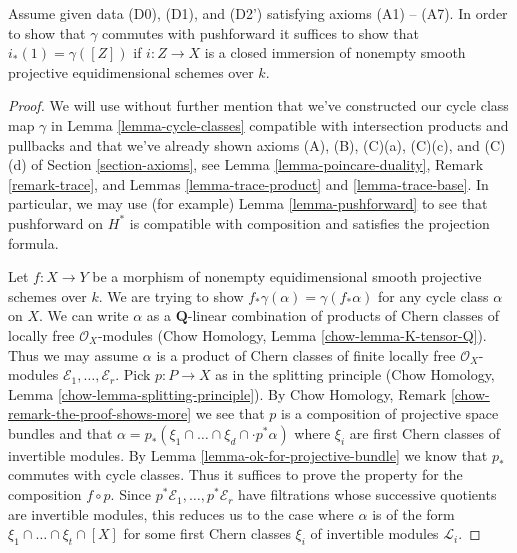 %
\begin{lemma}
\label{lemma-enough}
Assume given data (D0), (D1), and (D2') satisfying axioms (A1) -- (A7).
In order to show that $\gamma$ commutes with pushforward it suffices
to show that $i_*(1) = \gamma([Z])$ if $i : Z \to X$ is a closed
immersion of nonempty smooth projective equidimensional schemes over $k$.
\end{lemma}

\begin{proof}
We will use without further mention that we've constructed our
cycle class map $\gamma$ in Lemma \ref{lemma-cycle-classes}
compatible with intersection products and pullbacks and that
we've already shown axioms
(A), (B), (C)(a), (C)(c), and (C)(d) of Section \ref{section-axioms}, see
Lemma \ref{lemma-poincare-duality},
Remark \ref{remark-trace}, and
Lemmas \ref{lemma-trace-product} and \ref{lemma-trace-base}.
In particular, we may use (for example) Lemma \ref{lemma-pushforward}
to see that pushforward on $H^*$ is compatible with composition
and satisfies the projection formula.

\medskip\noindent
Let $f : X \to Y$ be a morphism of nonempty
equidimensional smooth projective schemes over $k$.
We are trying to show $f_*\gamma(\alpha) = \gamma(f_*\alpha)$
for any cycle class $\alpha$ on $X$.
We can write $\alpha$ as a $\mathbf{Q}$-linear combination of products of
Chern classes of locally free $\mathcal{O}_X$-modules
(Chow Homology, Lemma \ref{chow-lemma-K-tensor-Q}).
Thus we may assume $\alpha$ is a product of Chern classes of
finite locally free $\mathcal{O}_X$-modules
$\mathcal{E}_1, \ldots, \mathcal{E}_r$.
Pick $p : P \to X$ as in the splitting principle
(Chow Homology, Lemma \ref{chow-lemma-splitting-principle}).
By Chow Homology, Remark \ref{chow-remark-the-proof-shows-more}
we see that $p$ is a composition of projective space bundles and
that $\alpha = p_*(\xi_1 \cap \ldots \cap \xi_d \cap \cdot p^*\alpha)$
where $\xi_i$ are first Chern classes of invertible modules.
By Lemma \ref{lemma-ok-for-projective-bundle}
we know that $p_*$ commutes with cycle classes.
Thus it suffices to prove the property for the composition
$f \circ p$. Since $p^*\mathcal{E}_1, \ldots, p^*\mathcal{E}_r$
have filtrations whose successive quotients are invertible
modules, this reduces us to the case where $\alpha$ is
of the form $\xi_1 \cap \ldots \cap \xi_t \cap [X]$
for some first Chern classes $\xi_i$ of invertible modules $\mathcal{L}_i$.


\end{proof}
